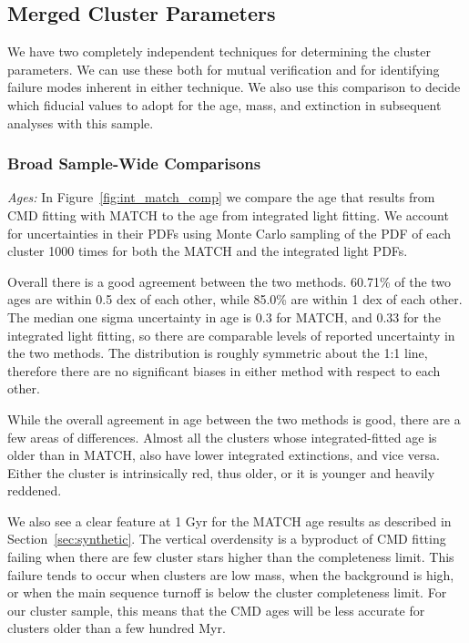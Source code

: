 \documentclass{emulateapj}
\begin{document}
\subsection{Merged Cluster Parameters}\label{sec:merged}
We have two completely independent techniques for determining the cluster parameters.  We can use these both for mutual verification and for identifying failure modes inherent in either technique.  We also use this comparison to decide which fiducial values to adopt for the age, mass, and extinction in subsequent analyses with this sample.


\subsubsection{Broad Sample-Wide Comparisons}\label{sec:broad}

{\emph {Ages:}}
In Figure~\ref{fig:int_match_comp} we compare the age that results from CMD fitting with MATCH to the age from integrated light fitting.  We account for uncertainties in their PDFs using Monte Carlo sampling of the PDF of each cluster 1000 times for both the MATCH and the integrated light PDFs. 

Overall there is a good agreement between the two methods.  60.71\% of the two ages are within 0.5 dex of each other, while 85.0\% are within 1 dex of each other.  The median one sigma uncertainty in age is 0.3 for MATCH, and 0.33 for the integrated light fitting, so there are comparable levels of reported uncertainty in the two methods.  The distribution is roughly symmetric about the 1:1 line, therefore there are no significant biases in either method with respect to each other.

While the overall agreement in age between the two methods is good, there are a few areas of differences.  Almost all the clusters whose integrated-fitted age is older than in MATCH, also have lower integrated extinctions, and vice versa.  Either the cluster is intrinsically red, thus older, or it is younger and heavily reddened.  

We also see a clear feature at 1 Gyr for the MATCH age results as described in Section~\ref{sec:synthetic}.  The vertical overdensity is a byproduct of CMD fitting failing when there are few cluster stars higher than the completeness limit.  This failure tends to occur when clusters are low mass, when the background is high, or when the main sequence turnoff is below the cluster completeness limit.  For our cluster sample, this means that the CMD ages will be less accurate for clusters older than a few hundred Myr.  
\end{document}
